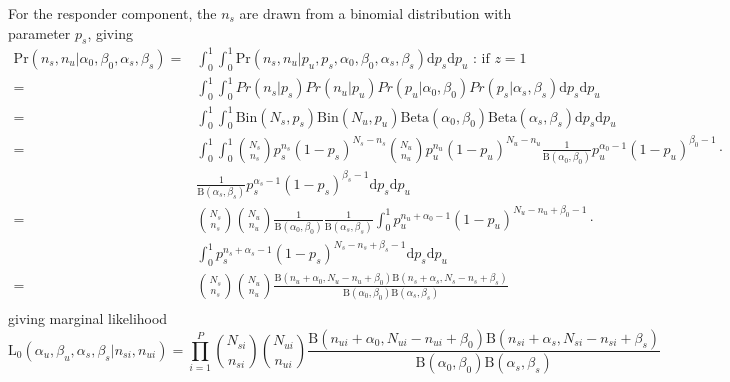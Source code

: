 \documentclass{article}
\begin{document}
For the responder component, the $n_s$ are drawn from a binomial distribution with parameter $p_s$, giving
\[
\begin{split}
\mathrm{Pr}(n_{s},n_{u}|\alpha_0,\beta_0,\alpha_s,\beta_s) =&\int_0^1\int_0^1 \mathrm{Pr}(n_{s},n_{u}|p_u,p_s,\alpha_0,\beta_0,\alpha_s,\beta_s)\mathrm{d}p_s\mathrm{d}p_u  \text{ : if } z=1 \\
=& \int_0^1\int_0^1Pr(n_s|p_s)Pr(n_u|p_u)Pr(p_u|\alpha_0,\beta_0)Pr(p_s|\alpha_s,\beta_s)\mathrm{d}p_s \mathrm{d}p_u\\
=&\int_0^1\int_0^1 \mathrm{Bin}(N_s,p_s)\mathrm{Bin}(N_u,p_u)\mathrm{Beta}(\alpha_0,\beta_0 )\mathrm{Beta}(\alpha_s,\beta_s )\mathrm{d}p_s \mathrm{d}p_u\\
=&\int_0^1\int_0^1\binom{N_s}{n_s}p_s^{n_s}(1-p_s)^{N_s-n_s}\binom{N_u}{n_u}p_u^{n_u}(1-p_u)^{N_u-n_u}\frac{1}{\mathrm{B}(\alpha_0,\beta_0)}p_u^{\alpha_0-1}(1-p_u)^{\beta_0-1} \cdot\\ 
&\frac{1}{\mathrm{B}(\alpha_s,\beta_s)}p_s^{\alpha_s-1}(1-p_s)^{\beta_s-1} \mathrm{d}p_s\mathrm{d}p_u\\
=&\binom{N_s}{n_s}\binom{N_u}{n_u}\frac{1}{\mathrm{B}(\alpha_0,\beta_0)}\frac{1}{\mathrm{B}(\alpha_s,\beta_s)}\int_0^1 p_u^{n_u+\alpha_0-1}(1-p_u)^{N_u-n_u+\beta_0-1} \cdot\\
&\int_0^1 p_s^{n_s+\alpha_s-1}(1-p_s)^{N_s-n_s+\beta_s-1}\mathrm{d}p_s\mathrm{d}p_u \\
=&\binom{N_s}{n_s}\binom{N_u}{n_u}\frac{\mathrm{B}(n_u+\alpha_0,N_u-n_u+\beta_0)\mathrm{B}(n_s+\alpha_s,N_s-n_s+\beta_s)}{\mathrm{B}(\alpha_0,\beta_0)\mathrm{B}(\alpha_s,\beta_s)}\\
\end{split}
\]
giving marginal likelihood
\[
\mathrm{L_0}(\alpha_u,\beta_u,\alpha_s,\beta_s|n_{si},n_{ui}) = \prod_{i=1}^P \binom{N_{si}}{n_{si}}\binom{N_{ui}}{n_{ui}}\frac{\mathrm{B}(n_{ui}+\alpha_0,N_{ui}-n_{ui}+\beta_0)\mathrm{B}(n_{si}+\alpha_s,N_{si}-n_{si}+\beta_s)}{\mathrm{B}(\alpha_0,\beta_0)\mathrm{B}(\alpha_s,\beta_s)}
\]
\end{document}

